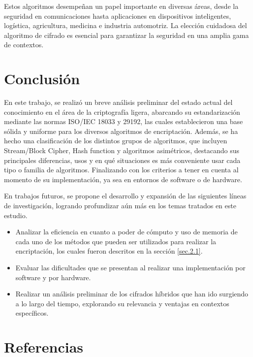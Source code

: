 \documentclass[a4paper,10pt]{article}
\begin{document}
	Estos algoritmos desempeñan un papel importante en diversas áreas, desde la seguridad en comunicaciones hasta aplicaciones en dispositivos inteligentes, logística, agricultura, medicina e industria automotriz. La elección cuidadosa del algoritmo de cifrado es esencial para garantizar la seguridad en una amplia gama de contextos.
	
	\section{Conclusión}
	En este trabajo, se realizó un breve análisis preliminar del estado actual del conocimiento en el área de la criptografía ligera, abarcando su estandarización mediante las normas ISO/IEC 18033 y 29192, las cuales establecieron una base sólida y uniforme para los diversos algoritmos de encriptación. Además, se ha hecho una clasificación de los distintos grupos de algoritmos, que incluyen Stream/Block Cipher, Hash function y algoritmos asimétricos, destacando sus principales diferencias, usos y en qué situaciones es más conveniente usar cada tipo o familia de algoritmos. Finalizando con los criterios a tener en cuenta al momento de su implementación, ya sea en entornos de software o de hardware.
	
	En trabajos futuros, se propone el desarrollo y expansión de las siguientes líneas de investigación, logrando profundizar aún más en los temas tratados en este estudio.

	\begin{itemize}
	\item Analizar la eficiencia en cuanto a poder de cómputo y uso de memoria de cada uno de los métodos que pueden ser utilizados para realizar la encriptación, los cuales fueron descritos en la sección \ref{sec.2.1}.
	\item Evaluar las dificultades que se presentan al realizar una implementación por software y por hardware.
	\item Realizar un análisis preliminar de los cifrados híbridos que han ido surgiendo a lo largo del tiempo, explorando su relevancia y ventajas en contextos específicos.
	\end{itemize}
	
	\section{Referencias}
	\nocite{*}
	\printbibliography[heading=none]
\end{document}
